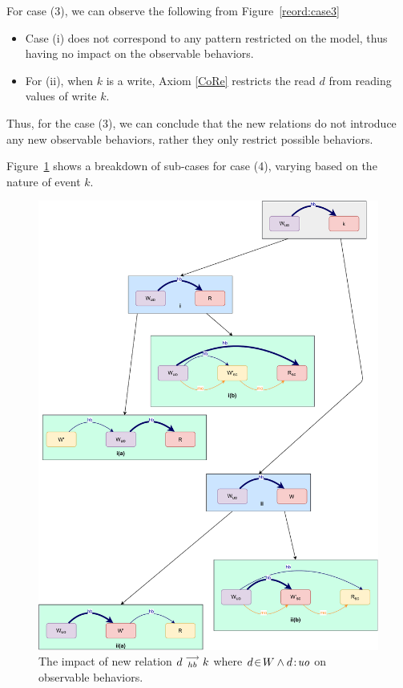     For case (3), we can observe the following from Figure~\ref{reord:case3}
    \begin{itemize}
        \item Case (i) does not correspond to any pattern restricted on the model, thus having no impact on the observable behaviors. 
        \item For (ii), when $k$ is a write, Axiom \ref{CoRe} restricts the read $d$ from reading values of write $k$. 
    \end{itemize}

    Thus, for the case (3), we can conclude that the new relations do not introduce any new observable behaviors, rather they only restrict possible behaviors.

    Figure~\ref{reord:case4} shows a breakdown of sub-cases for case (4), varying based on the nature of event $k$.
    \begin{figure}[H]
        \centering
        \includegraphics[scale=0.6]{4.InstructionReordering/4.ValidReorderingCandidate/ProofParts/Part4/part4(d).pdf}
        \caption{The impact of new relation $d\stackrel{\longrightarrow}{_{hb}}k$ where $d\!\in\!W \wedge d\!:\!\textit{uo}$ on observable behaviors.}
        \label{reord:case4}
    \end{figure}

